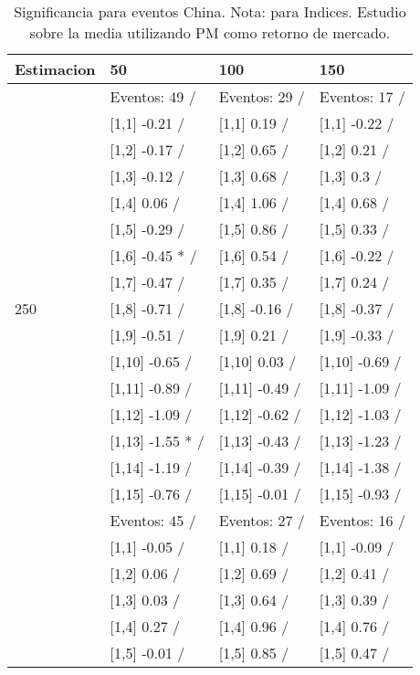 \begin{table}

\caption{Significancia para eventos China. Nota: para Indices. Estudio sobre la media utilizando PM como retorno de mercado.}
\centering
\begin{tabular}[t]{llll}
\toprule
Estimacion & 50 & 100 & 150\\
\midrule
 & Eventos:  49 / & Eventos:  29 / & Eventos:  17 /\\
 & {}[1,1] -0.21  / & {}[1,1] 0.19  / & {}[1,1] -0.22  /\\
 & {}[1,2] -0.17  / & {}[1,2] 0.65  / & {}[1,2] 0.21  /\\
 & {}[1,3] -0.12  / & {}[1,3] 0.68  / & {}[1,3] 0.3  /\\
 & {}[1,4] 0.06  / & {}[1,4] 1.06  / & {}[1,4] 0.68  /\\
\addlinespace
 & {}[1,5] -0.29  / & {}[1,5] 0.86  / & {}[1,5] 0.33  /\\
 & {}[1,6] -0.45 * / & {}[1,6] 0.54  / & {}[1,6] -0.22  /\\
 & {}[1,7] -0.47  / & {}[1,7] 0.35  / & {}[1,7] 0.24  /\\
250 & {}[1,8] -0.71  / & {}[1,8] -0.16  / & {}[1,8] -0.37  /\\
 & {}[1,9] -0.51  / & {}[1,9] 0.21  / & {}[1,9] -0.33  /\\
\addlinespace
 & {}[1,10] -0.65  / & {}[1,10] 0.03  / & {}[1,10] -0.69  /\\
 & {}[1,11] -0.89  / & {}[1,11] -0.49  / & {}[1,11] -1.09  /\\
 & {}[1,12] -1.09  / & {}[1,12] -0.62  / & {}[1,12] -1.03  /\\
 & {}[1,13] -1.55 * / & {}[1,13] -0.43  / & {}[1,13] -1.23  /\\
 & {}[1,14] -1.19  / & {}[1,14] -0.39  / & {}[1,14] -1.38  /\\
\addlinespace
 & {}[1,15] -0.76  / & {}[1,15] -0.01  / & {}[1,15] -0.93  /\\
 & Eventos:  45 / & Eventos:  27 / & Eventos:  16 /\\
 & {}[1,1] -0.05  / & {}[1,1] 0.18  / & {}[1,1] -0.09  /\\
 & {}[1,2] 0.06  / & {}[1,2] 0.69  / & {}[1,2] 0.41  /\\
 & {}[1,3] 0.03  / & {}[1,3] 0.64  / & {}[1,3] 0.39  /\\
\addlinespace
 & {}[1,4] 0.27  / & {}[1,4] 0.96  / & {}[1,4] 0.76  /\\
 & {}[1,5] -0.01  / & {}[1,5] 0.85  / & {}[1,5] 0.47  /\\

\end{tabular}
\end{table}
